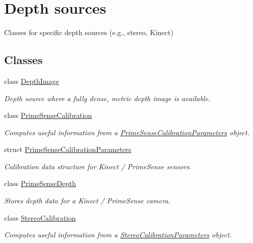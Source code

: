 \hypertarget{group__DepthSources}{
\section{Depth sources}
\label{group__DepthSources}
}


Classes for specific depth sources (e.g., stereo, Kinect)  


\subsection*{Classes}
\begin{DoxyCompactItemize}
\item 
class \hyperlink{classfovis_1_1DepthImage}{DepthImage}
\begin{DoxyCompactList}\small\item\em Depth source where a fully dense, metric depth image is available. \end{DoxyCompactList}\item 
class \hyperlink{classfovis_1_1PrimeSenseCalibration}{PrimeSenseCalibration}
\begin{DoxyCompactList}\small\item\em Computes useful information from a \hyperlink{structfovis_1_1PrimeSenseCalibrationParameters}{PrimeSenseCalibrationParameters} object. \end{DoxyCompactList}\item 
struct \hyperlink{structfovis_1_1PrimeSenseCalibrationParameters}{PrimeSenseCalibrationParameters}
\begin{DoxyCompactList}\small\item\em Calibration data structure for Kinect / PrimeSense sensors. \end{DoxyCompactList}\item 
class \hyperlink{classfovis_1_1PrimeSenseDepth}{PrimeSenseDepth}
\begin{DoxyCompactList}\small\item\em Stores depth data for a Kinect / PrimeSense camera. \end{DoxyCompactList}\item 
class \hyperlink{classfovis_1_1StereoCalibration}{StereoCalibration}
\begin{DoxyCompactList}\small\item\em Computes useful information from a \hyperlink{structfovis_1_1StereoCalibrationParameters}{StereoCalibrationParameters} object. \end{DoxyCompactList}\item 

\end{DoxyCompactItemize}
